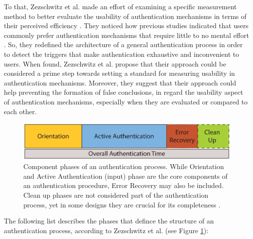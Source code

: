 To that, Zezschwitz et al. \cite{Zezschwitz} made an effort of examining a specific measurement method to better evaluate the usability of authentication mechanisms in terms of their perceived efficiency \cite{Zezschwitz}. They noticed how previous studies indicated that users commonly prefer authentication mechanisms that require little to no mental effort \cite{Zezschwitz, AnatomySmartphone}. So, they redefined the architecture of a general authentication process in order to detect the triggers that make authentication exhaustive and inconvenient to users. When found, Zezschwitz et al. \cite{Zezschwitz} propose that their approach could be considered a prime step towards setting a standard for measuring usability in authentication mechanisms. Moreover, they suggest that their approach could help preventing the formation of false conclusions, in regard the usability aspect of authentication mechanisms, especially when they are evaluated or compared to each other.  \\

\begin{figure}[t!]
\centering
\includegraphics[width=13cm, height=2cm]{Chapters/graphics/Phases.PNG}
\caption{Component phases of an authentication process. While Orientation and Active Authentication (input) phase are the core components of an authentication procedure, Error Recovery may also be included. Clean up phases are not considered part of the authentication process, yet in some designs they are crucial for its completeness \cite{Zezschwitz}. }
\label{fig:phases}
\end{figure}

The following list describes the phases that defince the structure of an authentication process, according to Zezschwitz et al. \cite{Zezschwitz} (see Figure \ref{fig:phases}):


